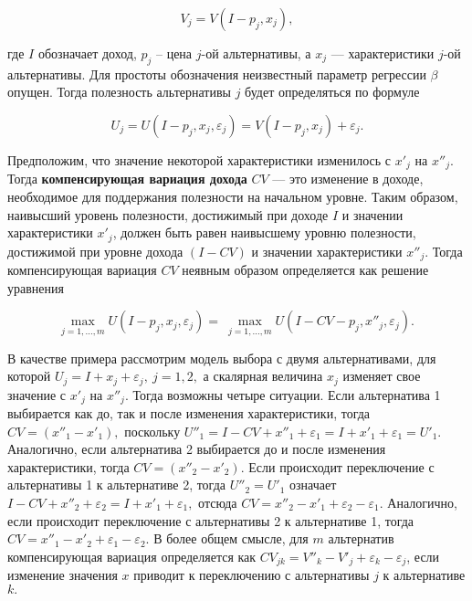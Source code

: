 \begin{equation} \label{GrindEQ__15_27_} V_j=V\left(I-p_j,x_j\right), \end{equation} 

где $I$ обозначает доход, $p_j$ -- цена $j$-ой альтернативы, а $x_j$ --- характеристики $j$-ой альтернативы. Для простоты обозначения неизвестный параметр регрессии $\beta $ опущен. Тогда полезность альтернативы $j$ будет определяться по формуле

\begin{equation} \label{GrindEQ__15_28_} U_j=U\left(I-p_j,x_j,{\varepsilon }_j\right)=V\left(I-p_j,x_j\right)+{\varepsilon }_j. \end{equation} 

Предположим, что значение некоторой характеристики изменилось с $x'_j$ на $x''_j$. Тогда \textbf{компенсирующая вариация дохода } $CV$ --- это изменение в доходе, необходимое для поддержания полезности на начальном уровне. Таким образом, наивысший уровень полезности, достижимый при доходе $I$ и значении характеристики $x'_j$, должен быть равен наивысшему уровню полезности, достижимой при уровне дохода $(I-CV)$ и значении характеристики $x''_j$. Тогда компенсирующая вариация $CV$ неявным образом определяется как решение уравнения 

\begin{equation} \label{GrindEQ__15_29_} {\mathop{\max }_{j=1,\dots ,m} U\left(I-p_j,x_j,{\varepsilon }_j\right)=\ }{\mathop{\max }_{j=1,\dots ,m} U\left(I-CV-p_j,x''_j,{\varepsilon }_j\right).\ } \end{equation} 

В качестве примера рассмотрим модель выбора с двумя альтернативами, для которой $U_j=I+x_j+{\varepsilon }_j,\ j=1,2,$ а скалярная величина $x_j$ изменяет свое значение с $x'_j$ на $x''_j$. Тогда возможны четыре ситуации. Если альтернатива 1 выбирается как до, так и после изменения характеристики, тогда $CV=\left(x''_1-x'_1\right),$ поскольку $U''_1=I-CV+x''_1+{\varepsilon }_1=I+x'_1+{\varepsilon }_1=U'_1.$ Аналогично, если альтернатива 2 выбирается до и после изменения характеристики, тогда $CV=\left(x''_2-x'_2\right).$ Если происходит переключение с альтернативы 1 к альтернативе 2, тогда $U''_2=U'_1$ означает $I-CV+x''_2+{\varepsilon }_2=I+x'_1+{\varepsilon }_1,$ отсюда $CV=x''_2-x'_1+{\varepsilon }_2-{\varepsilon }_1.$ Аналогично, если происходит переключение с альтернативы 2 к альтернативе 1, тогда $CV=x''_1-x'_2+{\varepsilon }_1-{\varepsilon }_2.$ В более общем смысле, для $m$ альтернатив компенсирующая вариация определяется как $CV_{jk}=V''_k-V'_j+{\varepsilon }_k-{\varepsilon }_j$, если изменение значения $x$ приводит к переключению с альтернативы $j$ к альтернативе $k.$

